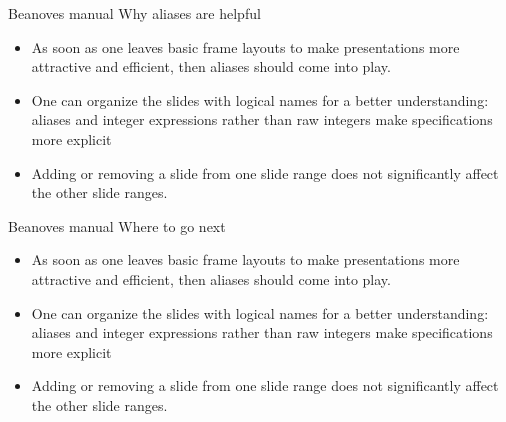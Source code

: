 \documentclass{beamer}
\begin{document}
\begin{frame}
{Beanoves manual}
{\large Why aliases are helpful}
\begin{itemize}
\item
As soon as one leaves basic frame layouts to make presentations more attractive and efficient, then  aliases should come into play.
\item
One can organize the slides with logical names for a better understanding: aliases and integer expressions rather than raw integers make specifications more explicit
\item
Adding or removing a slide from one slide range does not significantly affect the other slide ranges.
\end{itemize}
\end{frame}
\begin{frame}
{Beanoves manual}
{\large Where to go next}
\begin{itemize}
\item
As soon as one leaves basic frame layouts to make presentations more attractive and efficient, then  aliases should come into play.
\item
One can organize the slides with logical names for a better understanding: aliases and integer expressions rather than raw integers make specifications more explicit
\item
Adding or removing a slide from one slide range does not significantly affect the other slide ranges.
\end{itemize}
\end{frame}
\end{document}
